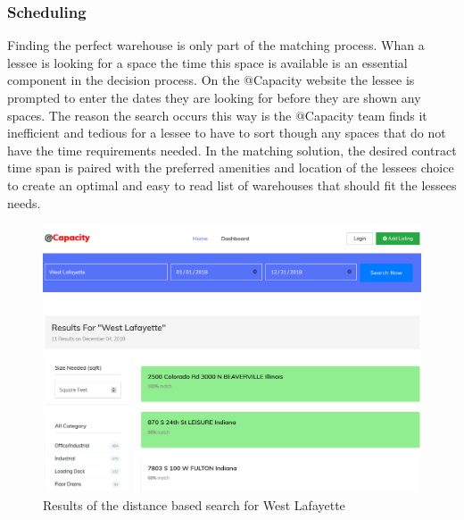 \subsubsection{Scheduling}
Finding the perfect warehouse is only part of the matching process. Whan a lessee is looking for a space the time this space is available is an essential component in the decision process. On the @Capacity website the lessee is prompted to enter the dates they are looking for before they are shown any spaces. The reason the search occurs this way is the @Capacity team finds it inefficient and tedious for a lessee to have to sort though any spaces that do not have the time requirements needed. In the matching solution, the desired contract time span is paired with the preferred amenities and location of the lessees choice to create an optimal and easy to read list of warehouses that should fit the lessees needs.  


\begin{figure}[H]
\centering
\includegraphics[width=.75\textwidth]{Phase_3/distance}
\caption{Results of the distance based search for West Lafayette}
\label{fig:distance}
\end{figure}

